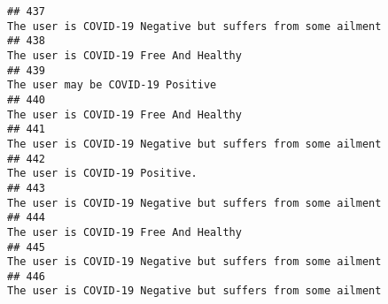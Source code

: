 \documentclass[
]{article}
\begin{document}
\begin{verbatim}
## 437                                                                                                                                                                                                        The user is COVID-19 Negative but suffers from some ailment
## 438                                                                                                                                                                                                                              The user is COVID-19 Free And Healthy
## 439                                                                                                                                                                                                                                  The user may be COVID-19 Positive
## 440                                                                                                                                                                                                                              The user is COVID-19 Free And Healthy
## 441                                                                                                                                                                                                        The user is COVID-19 Negative but suffers from some ailment
## 442                                                                                                                                                                                                                                     The user is COVID-19 Positive.
## 443                                                                                                                                                                                                        The user is COVID-19 Negative but suffers from some ailment
## 444                                                                                                                                                                                                                              The user is COVID-19 Free And Healthy
## 445                                                                                                                                                                                                        The user is COVID-19 Negative but suffers from some ailment
## 446                                                                                                                                                                                                        The user is COVID-19 Negative but suffers from some ailment

\end{verbatim}
\end{document}
